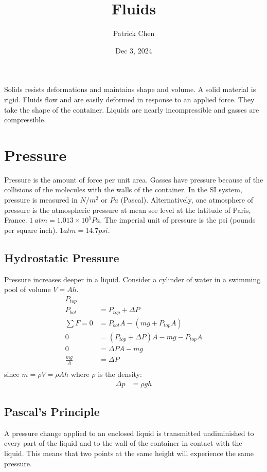 \documentclass{article}
\title{Fluids}
\author{Patrick Chen}
\date{Dec 3, 2024}
\theoremstyle{mytheoremstyle}
\theoremstyle{mytheoremstyle}
\theoremstyle{myproblemstyle}
\begin{document}
    \maketitle
    Solids resists deformations and maintains shape and volume. A solid material
    is rigid. Fluids flow and are easily deformed in response to an applied
    force. They take the shape of the container. Liquids are nearly
    incompressible and gasses are compressible.

    \section*{Pressure}
    Pressure is the amount of force per unit area. Gasses have pressure because
    of the collisions of the molecules with the walls of the container. In the
    SI system, pressure is measured in $N/m^2$ or $Pa$ (Pascal). Alternatively,
    one atmosphere of pressure is the atmospheric pressure at mean see level at
    the latitude of Paris, France. $1\ atm = 1.013\times 10^5 Pa$. The imperial
    unit of pressure is the psi (pounds per square inch). $1 atm = 14.7 psi$.

    \subsection*{Hydrostatic Pressure}
    Pressure increases deeper in a liquid. Consider a cylinder of water in a
    swimming pool of volume $V=Ah$.
    \begin{align*}
        P_{top} \\
        P_{bot} &= P_{top} + \Delta P \\
        \sum F = 0 &= P_{bot}A - (mg + P_{top}A) \\
        0 &= (P_{top}+\Delta P) A - mg - P_{top}A \\
        0 &= \Delta P A - mg \\
        \frac{mg}{A} &= \Delta P \\
    \end{align*}
    since $m = \rho V = \rho A h$ where $\rho$ is the density:
    \begin{align*}
        \Delta p &= \rho g h
    \end{align*}

    \subsection*{Pascal's Principle}
    A pressure change applied to an enclosed liquid is transmitted undiminished
    to every part of the liquid and to the wall of the container in contact with
    the liquid. This means that two points at the same height will experience
    the same pressure.
\end{document}
